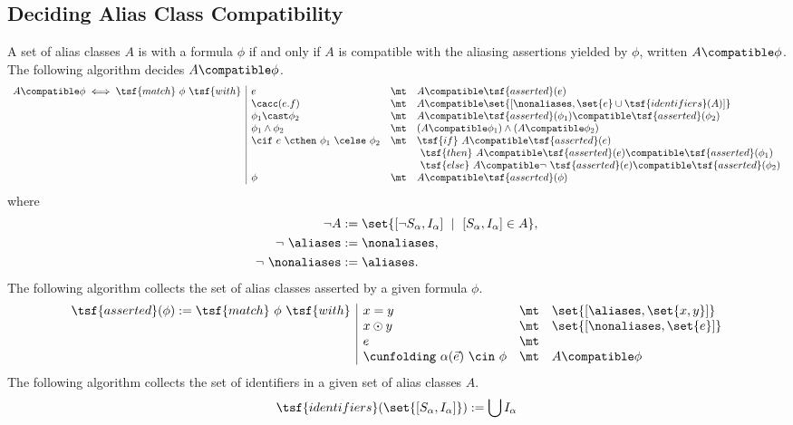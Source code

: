 \subsection{Deciding Alias Class Compatibility}
\noindent
A set of alias classes $A$ is  with a formula $\phi$ if and only if $A$ is compatible with the aliasing assertions yielded by $\phi$, written $A \compatible \phi$.
The following algorithm decides $A \compatible \phi$.
\begin{align*}
\begin{array}{r|lrl}
A \compatible \phi
\iff \tsf{match} \ \phi \ \tsf{with}
%
%
& e                   &\mt& A \compatible \tsf{asserted}(e)
\\
%
& \cacc(e.f)          &\mt& A \compatible \set{ [\nonaliases, \set{e} \cup \tsf{identifiers}(A) ] }
\\
& \phi_1 \cast \phi_2 &\mt& A \compatible \tsf{asserted}(\phi_1) \compatible \tsf{asserted}(\phi_2)
\\
& \phi_1 \land \phi_2 &\mt& (A \compatible \phi_1) \land (A \compatible \phi_2)
\\
& \cif \ e \
  \cthen \ \phi_1 \
  \celse \ \phi_2     &\mt& \tsf{if}     \ A \compatible \tsf{asserted}(e) \\
                        &&& \ \tsf{then} \ A \compatible         \tsf{asserted}(e) \compatible \tsf{asserted}(\phi_1) \\
                        &&& \ \tsf{else} \ A \compatible \lnot \ \tsf{asserted}(e) \compatible \tsf{asserted}(\phi_2)
\\
& \phi                &\mt& A \compatible \tsf{asserted}(\phi)
\end{array}
\end{align*}
where
\begin{align*}
\lnot A &:= \set{ [\lnot S_\alpha, I_\alpha] \ \mid \ [S_\alpha, I_\alpha] \in A }, \\
\lnot \ \aliases &:= \nonaliases, \\
\lnot \ \nonaliases &:= \aliases.
\end{align*}
The following algorithm collects the set of alias classes asserted by a given formula $\phi$.
\begin{align*}
\begin{array}{r|lrl}
\tsf{asserted}(\phi) := \tsf{match} \ \phi \ \tsf{with}
& x = y               &\mt& \set{ [\aliases, \set{x,y}] }
\\
& x \odot y           &\mt&  \set{ [\nonaliases, \set{e} ] }
\\
& e                   &\mt& \empty
\\
& \cunfolding \
  \alpha(\vec{e}) \
  \cin \ \phi         &\mt& A \compatible \phi
\end{array}
\end{align*}
The following algorithm collects the set of identifiers in a given set of alias classes $A$.
\begin{align*}
\tsf{identifiers}(\set{ [S_\alpha, I_\alpha] }) := \bigcup I_\alpha
\end{align*}
